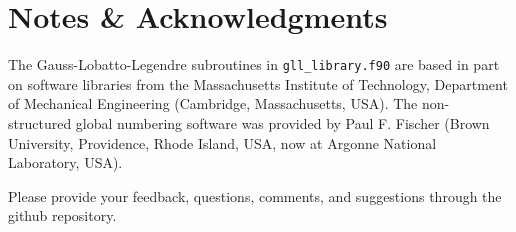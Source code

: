 
\chapter*{Notes \& Acknowledgments}


The Gauss-Lobatto-Legendre subroutines in \texttt{gll\_library.f90}
are based in part on software libraries from the Massachusetts Institute
of Technology, Department of Mechanical Engineering (Cambridge, Massachusetts, USA).
The non-structured global numbering software was provided by Paul
F. Fischer (Brown University, Providence, Rhode Island, USA, now at Argonne National Laboratory, USA).\newline

Please provide your feedback, questions, comments, and suggestions through the github repository.

